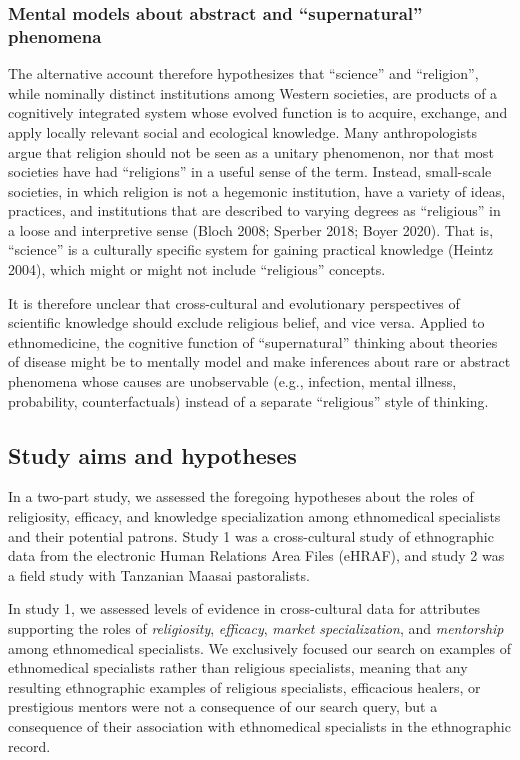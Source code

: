 \documentclass[
  11pt,
]{article}
\begin{document}
\hypertarget{mental-models-about-abstract-and-supernatural-phenomena}{%
\subsubsection{Mental models about abstract and ``supernatural'' phenomena}\label{mental-models-about-abstract-and-supernatural-phenomena}}

The alternative account therefore hypothesizes that ``science'' and ``religion'', while nominally distinct institutions among Western societies, are products of a cognitively integrated system whose evolved function is to acquire, exchange, and apply locally relevant social and ecological knowledge. Many anthropologists argue that religion should not be seen as a unitary phenomenon, nor that most societies have had ``religions'' in a useful sense of the term. Instead, small-scale societies, in which religion is not a hegemonic institution, have a variety of ideas, practices, and institutions that are described to varying degrees as ``religious'' in a loose and interpretive sense (Bloch 2008; Sperber 2018; Boyer 2020). That is, ``science'' is a culturally specific system for gaining practical knowledge (Heintz 2004), which might or might not include ``religious'' concepts.

It is therefore unclear that cross-cultural and evolutionary perspectives of scientific knowledge should exclude religious belief, and vice versa. Applied to ethnomedicine, the cognitive function of ``supernatural'' thinking about theories of disease might be to mentally model and make inferences about rare or abstract phenomena whose causes are unobservable (e.g., infection, mental illness, probability, counterfactuals) instead of a separate ``religious'' style of thinking.

\hypertarget{study-aims-and-hypotheses}{%
\subsection{Study aims and hypotheses}\label{study-aims-and-hypotheses}}

In a two-part study, we assessed the foregoing hypotheses about the roles of religiosity, efficacy, and knowledge specialization among ethnomedical specialists and their potential patrons. Study 1 was a cross-cultural study of ethnographic data from the electronic Human Relations Area Files (eHRAF), and study 2 was a field study with Tanzanian Maasai pastoralists.

In study 1, we assessed levels of evidence in cross-cultural data for attributes supporting the roles of \emph{religiosity}, \emph{efficacy}, \emph{market specialization}, and \emph{mentorship} among ethnomedical specialists. We exclusively focused our search on examples of ethnomedical specialists rather than religious specialists, meaning that any resulting ethnographic examples of religious specialists, efficacious healers, or prestigious mentors were not a consequence of our search query, but a consequence of their association with ethnomedical specialists in the ethnographic record.
\end{document}

